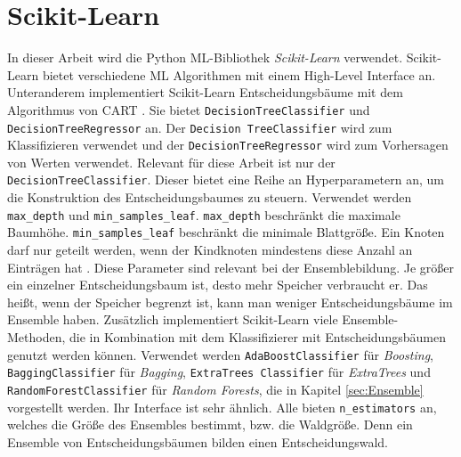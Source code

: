 \section{Scikit-Learn}
In dieser Arbeit wird die Python ML-Bibliothek \textit{Scikit-Learn} verwendet. Scikit-Learn bietet verschiedene ML Algorithmen mit einem High-Level Interface an. Unteranderem implementiert Scikit-Learn
Entscheidungsbäume mit dem Algorithmus von CART \cite{ScikitLearnCART}. Sie bietet \texttt{DecisionTreeClassifier} und \texttt{DecisionTreeRegressor} an. Der \texttt{Decision TreeClassifier} wird zum Klassifizieren
verwendet und der \texttt{DecisionTreeRegressor} wird zum Vorhersagen von Werten verwendet.
\newline
\newline
Relevant für diese Arbeit ist nur der \texttt{DecisionTreeClassifier}. Dieser bietet eine Reihe an Hyperparametern an, um die Konstruktion des Entscheidungsbaumes zu steuern. Verwendet werden \texttt{max\_depth}
und \texttt{min\_samples\_leaf}. \texttt{max\_depth} beschränkt die maximale Baumhöhe. \texttt{min\_samples\_leaf} beschränkt die minimale Blattgröße. Ein Knoten darf nur geteilt
werden, wenn der Kindknoten mindestens diese Anzahl an Einträgen hat \cite{ScikitLearnDTC}. Diese Parameter sind relevant bei der Ensemblebildung. Je größer ein einzelner Entscheidungsbaum ist, desto mehr Speicher
verbraucht er. Das heißt, wenn der Speicher begrenzt ist, kann man weniger Entscheidungsbäume im Ensemble haben.
\newline
\newline
Zusätzlich implementiert Scikit-Learn viele Ensemble-Methoden, die in Kombination mit dem Klassifizierer mit Entscheidungsbäumen genutzt werden können. Verwendet werden \texttt{AdaBoostClassifier}
für \textit{Boosting}, \texttt{BaggingClassifier} für \textit{Bagging}, \texttt{ExtraTrees Classifier} für \textit{ExtraTrees} und \texttt{RandomForestClassifier} für \textit{Random Forests}, die in
Kapitel \ref{sec:Ensemble} vorgestellt werden. Ihr Interface ist sehr ähnlich. Alle bieten \texttt{n\_estimators} an, welches die Größe des Ensembles bestimmt, bzw. die Waldgröße. Denn ein Ensemble von
Entscheidungsbäumen bilden einen Entscheidungswald.